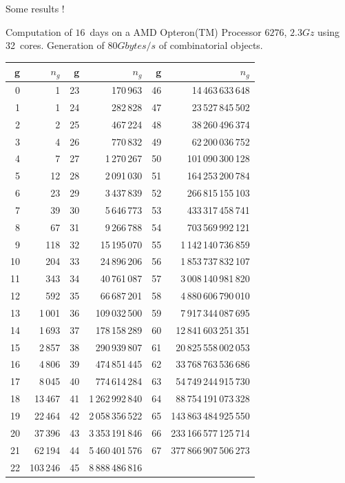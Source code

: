 \documentclass[compress,11pt]{beamer}
\begin{document}
\begin{frame}[fragile]{Some results !}

  Computation of $16$~days on a AMD Opteron(TM) Processor $6276$, $2.3Gz$
  using 32~cores. Generation of $80 Gbytes/s$ of combinatorial objects.

\tiny
\begin{center}
\begin{tabular}{|r|r||r|r||r|r|}
\hline
g & $n_g$ & g & $n_g$ & g & $n_g$ \\
\hline
0 & 1 & 23 & 170\,963 & 46 & 14\,463\,633\,648\\
1 & 1 & 24 & 282\,828 & 47 & 23\,527\,845\,502\\
2 & 2 & 25 & 467\,224 & 48 & 38\,260\,496\,374\\
3 & 4 & 26 & 770\,832 & 49 & 62\,200\,036\,752\\
4 & 7 & 27 & 1\,270\,267 & 50 & 101\,090\,300\,128\\
5 & 12 & 28 & 2\,091\,030 & 51 & 164\,253\,200\,784\\
6 & 23 & 29 & 3\,437\,839 & 52 & 266\,815\,155\,103\\
7 & 39 & 30 & 5\,646\,773 & 53 & 433\,317\,458\,741\\
8 & 67 & 31 & 9\,266\,788 & 54 & 703\,569\,992\,121\\
9 & 118 & 32 & 15\,195\,070 & 55 & 1\,142\,140\,736\,859\\
10 & 204 & 33 & 24\,896\,206 & 56 & 1\,853\,737\,832\,107\\
11 & 343 & 34 & 40\,761\,087 & 57 & 3\,008\,140\,981\,820\\
12 & 592 & 35 & 66\,687\,201 & 58 & 4\,880\,606\,790\,010\\
13 & 1\,001 & 36 & 109\,032\,500 & 59 & 7\,917\,344\,087\,695\\
14 & 1\,693 & 37 & 178\,158\,289 & 60 & 12\,841\,603\,251\,351\\
15 & 2\,857 & 38 & 290\,939\,807 & 61 & 20\,825\,558\,002\,053\\
16 & 4\,806 & 39 & 474\,851\,445 & 62 & 33\,768\,763\,536\,686\\
17 & 8\,045 & 40 & 774\,614\,284 & 63 & 54\,749\,244\,915\,730\\
18 & 13\,467 & 41 & 1\,262\,992\,840 & 64 & 88\,754\,191\,073\,328\\
19 & 22\,464 & 42 & 2\,058\,356\,522 & 65 & 143\,863\,484\,925\,550\\
20 & 37\,396 & 43 & 3\,353\,191\,846 & 66 & 233\,166\,577\,125\,714\\
21 & 62\,194 & 44 & 5\,460\,401\,576 & 67 & 377\,866\,907\,506\,273\\
22 & 103\,246 & 45 & 8\,888\,486\,816 & &\\
\hline
\end{tabular}
\end{center}
\end{frame}
\end{document}
